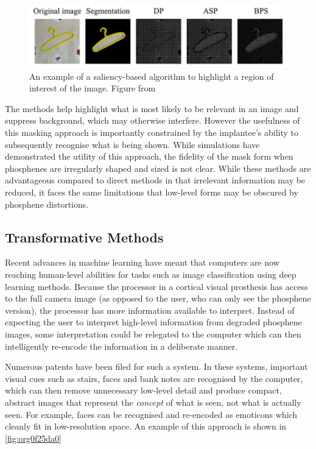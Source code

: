 \documentclass[a4paper,11pt,openany]{book}
\begin{document}
\begin{figure}[htbp]
\centering
\includegraphics[width=.9\linewidth]{./graphics/litreview/saliency.png}
\caption[Example of using a saliency-based algorithm to highlight a region of interest]{\label{fig:orgdbc97a4}
An example of a saliency-based algorithm to highlight a region of interest of the image. Figure from \cite{li_image_2018}}
\end{figure}

The methods help highlight what is most likely to be relevant in an image and suppress background, which may otherwise interfere.
However the usefulness of this masking approach is importantly constrained by the implantee's ability to subsequently recognise what is being shown.
While simulations have demonstrated the utility of this approach, the fidelity of the mask form when phosphenes are irregularly shaped and sized is not clear.
While these methods are advantageous compared to direct methods in that irrelevant information may be reduced, it faces the same limitations that low-level forms may be obscured by phosphene distortions.

\subsection*{Transformative Methods}
\label{sec:org7a14297}

Recent advances in machine learning have meant that computers are now reaching human-level abilities for tasks such as image classification using deep learning methods. \cite{rawat_deep_2017,guo_deep_2016}
Because the processor in a cortical visual prosthesis has access to the full camera image (as opposed to the user, who can only see the phosphene version), the processor has more information available to interpret.
Instead of expecting the user to interpret high-level information from degraded phosphene images, some interpretation could be relegated to the computer which can then intelligently re-encode the information in a deliberate manner.

Numerous patents have been filed for such a system. \cite{chichilnisky_eduardo-jose_smart_2018,li_going_2013}
In these systems, important visual cues such as stairs, faces and bank notes are recognised by the computer, which can then remove unnecessary low-level detail and produce compact, abstract images that represent the \emph{concept} of what is seen, not what is actually seen.
For example, faces can be recognised and re-encoded as emoticons which cleanly fit in low-resolution space. \cite{lui_transformative_2012}
An example of this approach is shown in \ref{fig:org0f25da0}
\end{document}
